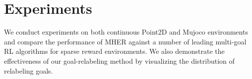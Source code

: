 \documentclass{article}
\begin{document}






\section{Experiments}
We conduct experiments on both continuous Point2D and Mujoco environments and
compare the performance of MHER against a number of leading multi-goal RL algorithms for sparse reward environments. We also demonstrate the effectiveness of our goal-relabeling method by visualizing the distribution of relabeling goals. 
\end{document}
